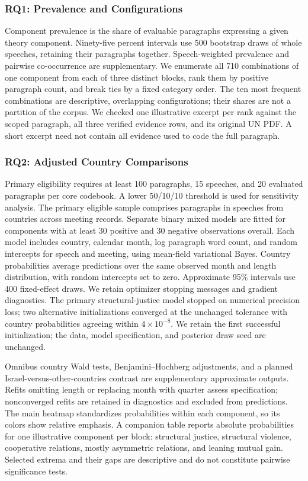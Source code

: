 \documentclass[sigconf,review,anonymous,balance=false]{acmart}
\begin{document}
\subsubsection{RQ1: Prevalence and Configurations}
Component prevalence is the share of evaluable paragraphs expressing a given
theory component.
Ninety-five percent intervals use 500 bootstrap draws of whole speeches,
retaining their paragraphs together. Speech-weighted prevalence and
pairwise co-occurrence are supplementary. We enumerate all 710 combinations
of one component from each of three distinct blocks, rank them by positive
paragraph count, and break ties by a fixed category order. The ten most frequent
combinations are descriptive, overlapping configurations; their shares
are not a partition of the corpus. We checked one illustrative excerpt
per rank against the scoped paragraph, all three verified evidence rows,
and its original UN PDF. A short excerpt need not contain all evidence
used to code the full paragraph.

\subsubsection{RQ2: Adjusted Country Comparisons}
Primary eligibility requires at least 100 paragraphs, 15 speeches, and
20 evaluated paragraphs per core codebook. A lower 50/10/10 threshold is
used for sensitivity analysis. The primary eligible sample comprises
\PrimaryParagraphs{} paragraphs in \PrimarySpeeches{} speeches from \EligibleCountries{} countries across \PrimaryMeetings{} meeting records.
Separate binary mixed models are fitted
for components with at least 30 positive and 30 negative observations overall.
Each model includes country, calendar month, log paragraph word count,
and random intercepts for speech and meeting, using mean-field variational
Bayes. Country probabilities average predictions over the same observed
month and length distribution, with random intercepts set to zero.
Approximate 95\% intervals use 400 fixed-effect draws.
We retain optimizer stopping messages and gradient diagnostics. The primary
structural-justice model stopped on numerical precision loss; two alternative initializations
converged at the unchanged tolerance with country probabilities agreeing
within $4\times10^{-8}$. We retain the first successful initialization;
the data, model specification, and posterior draw seed are unchanged.

Omnibus country Wald tests, Benjamini--Hochberg adjustments, and a planned
Israel-versus-other-countries contrast are supplementary approximate outputs.
Refits omitting length or replacing month with quarter assess specification;
nonconverged refits are retained in diagnostics and excluded from predictions.
The main heatmap standardizes probabilities within each component, so its colors
show relative emphasis. A companion table reports absolute probabilities
for one illustrative component per block: structural justice, structural
violence, cooperative relations, mostly asymmetric relations, and leaning
mutual gain. Selected extrema and their
gaps are descriptive and do not constitute pairwise significance tests.
\end{document}
